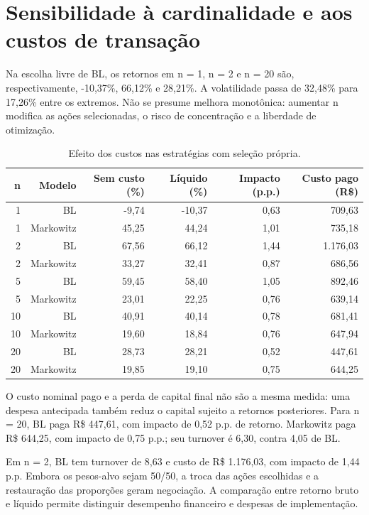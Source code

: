 \section{Sensibilidade à cardinalidade e aos custos de transação}
Na escolha livre de BL, os retornos em n = 1, n = 2 e n = 20 são, respectivamente, -10,37\%, 66,12\% e 28,21\%. A volatilidade passa de 32,48\% para 17,26\% entre os extremos. Não se presume melhora monotônica: aumentar n modifica as ações selecionadas, o risco de concentração e a liberdade de otimização.

\begin{table}[H]
\centering
\caption{Efeito dos custos nas estratégias com seleção própria.}
{\footnotesize
\begin{tabular}{@{}rrrrrr@{}}
\hline
n & Modelo & Sem custo (\%) & Líquido (\%) & Impacto (p.p.) & Custo pago (R\$) \\ \hline
1 & BL & -9,74 & -10,37 & 0,63 & 709,63 \\
1 & Markowitz & 45,25 & 44,24 & 1,01 & 735,18 \\
2 & BL & 67,56 & 66,12 & 1,44 & 1.176,03 \\
2 & Markowitz & 33,27 & 32,41 & 0,87 & 686,56 \\
5 & BL & 59,45 & 58,40 & 1,05 & 892,46 \\
5 & Markowitz & 23,01 & 22,25 & 0,76 & 639,14 \\
10 & BL & 40,91 & 40,14 & 0,78 & 681,41 \\
10 & Markowitz & 19,60 & 18,84 & 0,76 & 647,94 \\
20 & BL & 28,73 & 28,21 & 0,52 & 447,61 \\
20 & Markowitz & 19,85 & 19,10 & 0,75 & 644,25 \\
\hline
\end{tabular}}
\par{}
\end{table}
O custo nominal pago e a perda de capital final não são a mesma medida: uma despesa antecipada também reduz o capital sujeito a retornos posteriores. Para n = 20, BL paga R\$ 447,61, com impacto de 0,52 p.p. de retorno. Markowitz paga R\$ 644,25, com impacto de 0,75 p.p.; seu turnover é 6,30, contra 4,05 de BL.

Em n = 2, BL tem turnover de 8,63 e custo de R\$ 1.176,03, com impacto de 1,44 p.p. Embora os pesos-alvo sejam 50/50, a troca das ações escolhidas e a restauração das proporções geram negociação. A comparação entre retorno bruto e líquido permite distinguir desempenho financeiro e despesas de implementação.

